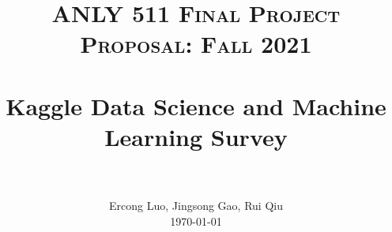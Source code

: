 \title{
	\normalfont \normalsize \textsc{ANLY 511 Final Project Proposal: Fall 2021} \\ [10pt]
	\horrule{1pt} \\[0.25cm]
	\LARGE Kaggle Data Science and Machine Learning Survey\\
	\horrule{1pt} \\[0.2cm]
}
\author{
	\normalfont 								\normalsize
	Ercong Luo, Jingsong Gao, Rui Qiu\\[-3pt] \normalsize
	\today
}
\date{\vspace{-3ex}}

\maketitle


	